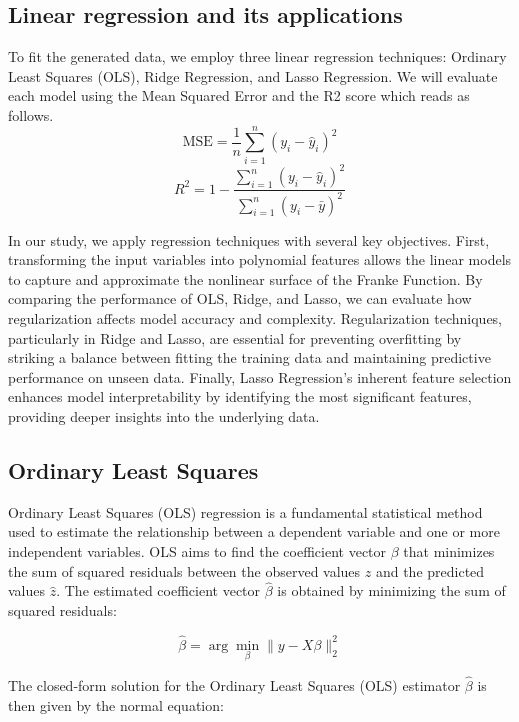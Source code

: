 \documentclass{article}
\begin{document}
\subsection{Linear regression and its applications}

To fit the generated data, we employ three linear regression techniques: Ordinary Least Squares (OLS), Ridge Regression, and Lasso Regression. We will evaluate each model using the Mean Squared Error and the R2 score which reads as follows.
\begin{equation}
    \text{MSE} = \frac{1}{n} \sum_{i=1}^{n} (y_i - \hat{y}_i)^2
\end{equation}
\begin{equation}
    R^2 = 1 - \frac{\sum_{i=1}^{n} (y_i - \hat{y}_i)^2}{\sum_{i=1}^{n} (y_i - \bar{y})^2}
\end{equation}
\newline

In our study, we apply regression techniques with several key objectives. First, transforming the input variables into polynomial features allows the linear models to capture and approximate the nonlinear surface of the Franke Function. By comparing the performance of OLS, Ridge, and Lasso, we can evaluate how regularization affects model accuracy and complexity. Regularization techniques, particularly in Ridge and Lasso, are essential for preventing overfitting by striking a balance between fitting the training data and maintaining predictive performance on unseen data. Finally, Lasso Regression's inherent feature selection enhances model interpretability by identifying the most significant features, providing deeper insights into the underlying data.

\subsection{Ordinary Least Squares}
Ordinary Least Squares (OLS) regression is a fundamental statistical method used to estimate the relationship between a dependent variable and one or more independent variables. OLS aims to find the coefficient vector \(\beta\) that minimizes the sum of squared residuals between the observed values \(z\) and the predicted values \(\hat{z}\). 
The estimated coefficient vector \( \hat{\beta} \) is obtained by minimizing the sum of squared residuals:

\[
\hat{\beta} = \arg \min_{\beta} \| y - X \beta \|_2^2
\]

The closed-form solution for the Ordinary Least Squares (OLS) estimator \( \hat{\beta} \) is then given by the normal equation:
\end{document}
